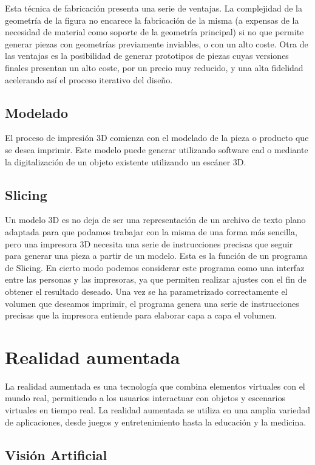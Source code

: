 Esta técnica de fabricación presenta una serie de ventajas. La complejidad de la geometría de la figura no encarece la fabricación de la misma (a expensas de la necesidad de material como soporte de la geometría principal) si no que permite generar piezas con geometrías previamente inviables, o con un alto coste.
Otra de las ventajas es la posibilidad de generar prototipos de piezas cuyas versiones finales presentan un alto coste, por un precio muy reducido, y una alta fidelidad acelerando así el proceso iterativo del diseño.

\subsection{Modelado}

El proceso de impresión 3D comienza con el modelado de la pieza o producto que se desea imprimir. Este modelo puede generar utilizando software \acrfull{cad} o mediante la digitalización de un objeto existente utilizando un escáner 3D. 

\subsection{Slicing}
Un modelo 3D es no deja de ser una representación de un archivo de texto plano adaptada para que podamos trabajar con la misma de una forma más sencilla, pero una impresora 3D necesita una serie de instrucciones precisas que seguir para generar una pieza a partir de un modelo. Esta es la función de un programa de Slicing.
En cierto modo podemos considerar este programa como una interfaz entre las personas y las impresoras, ya que permiten realizar ajustes con el fin de obtener el resultado deseado. 
Una vez se ha parametrizado correctamente el volumen que deseamos imprimir, el programa genera una serie de instrucciones precisas que la impresora entiende para elaborar capa a capa el volumen.


\section{Realidad aumentada}

La realidad aumentada es una tecnología que combina elementos virtuales con el mundo real, permitiendo a los usuarios interactuar con objetos y escenarios virtuales en tiempo real. La realidad aumentada se utiliza en una amplia variedad de aplicaciones, desde juegos y entretenimiento hasta la educación y la medicina.

\subsection{Visión Artificial}

